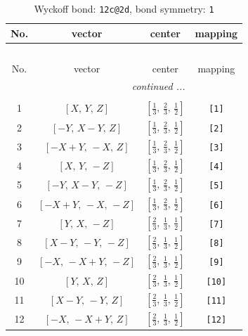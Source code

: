 \documentclass[fleqn,8pt]{jsarticle}
\begin{document}
\renewcommand{\arraystretch}{1.2}
\begin{longtable}{cccc}
\caption{Wyckoff bond: {\tt 12c@2d}, bond symmetry: {\tt 1}}
 \\
 \hline \hline
No. & vector & center & mapping \\ \hline \endfirsthead

\multicolumn{3}{l}{\tablename\ \thetable{}} \\
 \hline \hline
No. & vector & center & mapping \\ \hline \endhead

 \hline \hline
\multicolumn{3}{r}{\footnotesize\it continued ...} \\ \endfoot

 \hline \hline
\multicolumn{3}{r}{} \\ \endlastfoot

1 & $\left[ X,\, Y,\, Z \right]$ & $\left[ \frac{1}{3},\, \frac{2}{3},\, \frac{1}{2} \right]$ & {\tt [1]} \\ \hline
2 & $\left[ - Y,\, X - Y,\, Z \right]$ & $\left[ \frac{1}{3},\, \frac{2}{3},\, \frac{1}{2} \right]$ & {\tt [2]} \\ \hline
3 & $\left[ - X + Y,\, - X,\, Z \right]$ & $\left[ \frac{1}{3},\, \frac{2}{3},\, \frac{1}{2} \right]$ & {\tt [3]} \\ \hline
4 & $\left[ X,\, Y,\, - Z \right]$ & $\left[ \frac{1}{3},\, \frac{2}{3},\, \frac{1}{2} \right]$ & {\tt [4]} \\ \hline
5 & $\left[ - Y,\, X - Y,\, - Z \right]$ & $\left[ \frac{1}{3},\, \frac{2}{3},\, \frac{1}{2} \right]$ & {\tt [5]} \\ \hline
6 & $\left[ - X + Y,\, - X,\, - Z \right]$ & $\left[ \frac{1}{3},\, \frac{2}{3},\, \frac{1}{2} \right]$ & {\tt [6]} \\ \hline
7 & $\left[ Y,\, X,\, - Z \right]$ & $\left[ \frac{2}{3},\, \frac{1}{3},\, \frac{1}{2} \right]$ & {\tt [7]} \\ \hline
8 & $\left[ X - Y,\, - Y,\, - Z \right]$ & $\left[ \frac{2}{3},\, \frac{1}{3},\, \frac{1}{2} \right]$ & {\tt [8]} \\ \hline
9 & $\left[ - X,\, - X + Y,\, - Z \right]$ & $\left[ \frac{2}{3},\, \frac{1}{3},\, \frac{1}{2} \right]$ & {\tt [9]} \\ \hline
10 & $\left[ Y,\, X,\, Z \right]$ & $\left[ \frac{2}{3},\, \frac{1}{3},\, \frac{1}{2} \right]$ & {\tt [10]} \\ \hline
11 & $\left[ X - Y,\, - Y,\, Z \right]$ & $\left[ \frac{2}{3},\, \frac{1}{3},\, \frac{1}{2} \right]$ & {\tt [11]} \\ \hline
12 & $\left[ - X,\, - X + Y,\, Z \right]$ & $\left[ \frac{2}{3},\, \frac{1}{3},\, \frac{1}{2} \right]$ & {\tt [12]} \\
\end{longtable}
\end{document}
